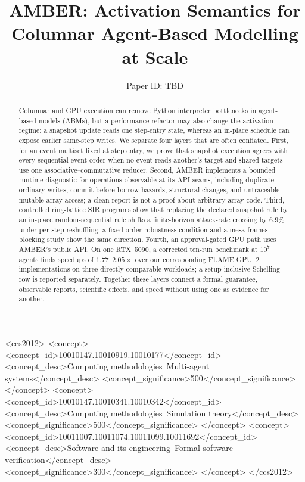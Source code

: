 \documentclass[sigconf,nonacm,review,natbib=true]{acmart}
\theoremstyle{definition}
\theoremstyle{plain}
\theoremstyle{remark}
\begin{document}
\title{AMBER: Activation Semantics for Columnar Agent-Based Modelling at Scale}

\newcommand{\submissionid}{TBD}
\author{Paper ID: \submissionid}
\renewcommand{\shortauthors}{Paper ID: \submissionid}

\begin{abstract}
Columnar and GPU execution can remove Python interpreter bottlenecks in
agent-based models (ABMs), but a performance refactor may also change the
activation regime: a snapshot update reads one step-entry state, whereas an
in-place schedule can expose earlier same-step writes. We separate four layers
that are often conflated. First, for an event multiset fixed at step entry, we
prove that snapshot execution agrees with every sequential event order when no
event reads another's target and shared targets use one associative--commutative
reducer. Second, AMBER implements a bounded runtime diagnostic for operations
observable at its API seams, including duplicate ordinary writes,
commit-before-borrow hazards, structural changes, and untraceable mutable-array
access; a clean report is not a proof about arbitrary array code. Third,
controlled ring-lattice SIR programs show that replacing the declared snapshot
rule by an in-place random-sequential rule shifts a finite-horizon attack-rate
crossing by $6.9\%$ under per-step reshuffling; a fixed-order robustness
condition and a mesa-frames blocking study show the same direction. Fourth, an
approval-gated GPU path uses AMBER's public API. On one RTX~5090, a corrected
ten-run benchmark at $10^7$ agents finds speedups of $1.77$--$2.05\times$ over
our corresponding FLAME GPU~2 implementations on three directly comparable
workloads; a setup-inclusive Schelling row is reported separately. Together
these layers connect a formal guarantee, observable reports, scientific
effects, and speed without using one as evidence for another.
\end{abstract}

\begin{CCSXML}
<ccs2012>
<concept>
<concept_id>10010147.10010919.10010177</concept_id>
<concept_desc>Computing methodologies~Multi-agent systems</concept_desc>
<concept_significance>500</concept_significance>
</concept>
<concept>
<concept_id>10010147.10010341.10010342</concept_id>
<concept_desc>Computing methodologies~Simulation theory</concept_desc>
<concept_significance>500</concept_significance>
</concept>
<concept>
<concept_id>10011007.10011074.10011099.10011692</concept_id>
<concept_desc>Software and its engineering~Formal software verification</concept_desc>
<concept_significance>300</concept_significance>
</concept>
</ccs2012>
\end{CCSXML}
\end{document}
